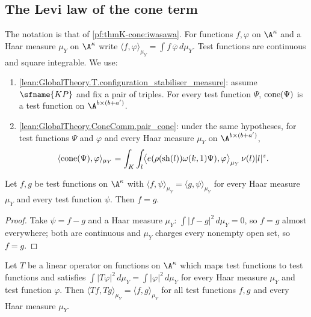 \subsection{The Levi law of the cone term}\label{pf:thmK-cone:levilaw}

The notation is that of \cref{pf:thmK-cone:iwasawa}.  For functions $f,\varphi$ on $\A^\kappa$ and a Haar measure $\mu_Y$
on $\A^\kappa$ write $\langle f,\varphi\rangle_{\mu_Y}=\int f\,\overline{\varphi}\,d\mu_Y$.  Test functions are continuous
and square integrable.  We use:
\begin{enumerate}[resume*=thmKconeD]
\item\label{pf:thmK-cone:D-conemem} \cref{lean:GlobalTheory.T.configuration_stabiliser_measure}: assume $\sfname{KP}$ and
  fix a pair of triples.  For every test function $\Psi$, $\operatorname{cone}(\Psi)$ is a test function on
  $\A^{b\times(b+a')}$.
\item\label{pf:thmK-cone:D-paircone} \cref{lean:GlobalTheory.ConeComm.pair_cone}: under the same hypotheses, for test
  functions $\Psi$ and $\varphi$ and every Haar measure $\mu_Y$ on $\A^{b\times(b+a')}$,
  \[
    \langle\operatorname{cone}(\Psi),\varphi\rangle_{\mu_Y}=\int_K\int_l
    \bigl\langle e(\rho(\operatorname{sh}(l))\omega(k,1)\Psi),\varphi\bigr\rangle_{\mu_Y}\,\nu(l)|l|^z .
  \]
\end{enumerate}

\begin{lemma}\label{pf:thmK-cone:pairsep}
Let $f,g$ be test functions on $\A^\kappa$ with $\langle f,\psi\rangle_{\mu_Y}=\langle g,\psi\rangle_{\mu_Y}$ for every Haar
measure $\mu_Y$ and every test function $\psi$.  Then $f=g$.
\end{lemma}

\begin{proof}
Take $\psi=f-g$ and a Haar measure $\mu_Y$: $\int|f-g|^2\,d\mu_Y=0$, so $f=g$ almost everywhere; both are continuous and
$\mu_Y$ charges every nonempty open set, so $f=g$.
\end{proof}

\begin{lemma}\label{pf:thmK-cone:polar}
Let $T$ be a linear operator on functions on $\A^\kappa$ which maps test functions to test functions and satisfies
$\int|T\varphi|^2\,d\mu_Y=\int|\varphi|^2\,d\mu_Y$ for every Haar measure $\mu_Y$ and test function $\varphi$.  Then
$\langle Tf,Tg\rangle_{\mu_Y}=\langle f,g\rangle_{\mu_Y}$ for all test functions $f,g$ and every Haar measure $\mu_Y$.
\end{lemma}

